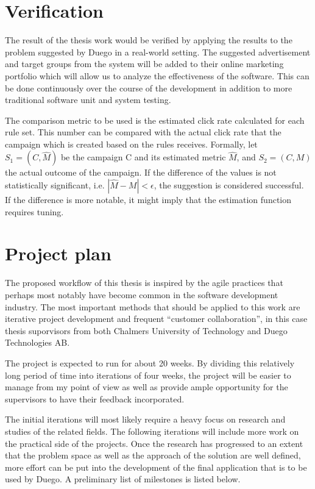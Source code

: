 \documentclass[a4paper]{article}
\begin{document}
\section{Verification}
The result of the thesis work would be verified by applying the results to the problem suggested by Duego in a real-world setting. The suggested advertisement and target groups from the system will be added to their online marketing portfolio which will allow us to analyze the effectiveness of the software. This can be done continuously over the course of the development in addition to more traditional software unit and system testing.

The comparison metric to be used is the estimated click rate calculated for each rule set. This number can be compared with the actual click rate that the campaign which is created based on the rules receives. Formally, let \(S_1 = (C, \hat{M})\) be the  campaign C and its estimated metric \(\hat{M}\), and \(S_2 = (C, M)\) the actual outcome of the campaign. If the difference  of the values is not statistically significant, i.e. \(|\hat{M} - M| < \epsilon\), the suggestion is considered successful. If the difference is more notable, it might imply that the estimation function requires tuning.

\section{Project plan}
The proposed workflow of this thesis is inspired by the agile practices that perhaps most notably have become common in the software development industry. The most important methods that should be applied to this work are iterative project development and frequent ``customer collaboration'', in this case thesis suporvisors from both Chalmers University of Technology and Duego Technologies AB.

The project is expected to run for about 20 weeks. By dividing this relatively long period of time into iterations of four weeks, the project will be easier to manage from my point of view as well as provide ample opportunity for the supervisors to have their feedback incorporated.

The initial iterations will most likely require a heavy focus on research and studies of the related fields. The following iterations will include more work on the practical side of the projects. Once the research has progressed to an extent that the problem space as well as the approach of the solution are well defined, more effort can be put into the development of the final application that is to be used by Duego. A preliminary list of milestones is listed below.
\end{document}
